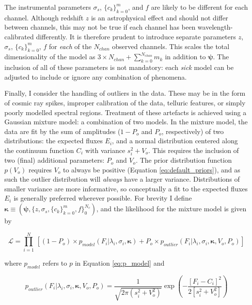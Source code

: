 \documentclass{aastex}
\newcommand{\sick}{\textit{sick}}
\begin{document}
The instrumental parameters $\sigma_{s}$, $\{c_k\}_{k=0}^{m}$, and $f$ are likely 
to be different for each channel. Although redshift $z$ is an astrophysical effect 
and should not differ between channels, this may not be true if each channel has 
been wavelength-calibrated differently. It is therefore prudent to introduce 
separate parameters $z$, $\sigma_{s}$, $\{c_k\}_{k=0}^{m}$, $f$ for \textit{each} 
of the $N_{chan}$ observed channels. This scales the total dimensionality of the 
model as $3\times{}N_{chan} + \sum_{k=0}^{N_{chan}}m_{k}$ in addition to $\bm{\psi}$. 
The inclusion of all of these parameters is not mandatory: each \sick{} model can 
be adjusted to include or ignore any combination of phenomena. 

Finally, I consider the handling of outliers in the data. These may be in the form 
of cosmic ray spikes, improper calibration of the data, telluric features, or simply 
poorly modelled spectral regions. Treatment of these artefacts is achieved using a 
Gaussian mixture model: a combination of two models. In the mixture model, the data 
are fit by the sum of amplitudes ($1 - P_o$ and $P_o$, respectively) of two 
distributions: the expected fluxes $E_i$, and a normal distribution centered along 
the continuum function $C_i$ with variance $s_{i}^2 + V_{o}$. This requires the 
inclusion of two (final) additional parameters: $P_o$ and $V_o$. The prior 
distribution function $p\left(V_o\right)$ requires $V_{o}$ to always be positive 
(Equation \ref{eq:default_priors}), and as such the outlier distribution will 
\textit{always} have a larger variance. Distributions of smaller variance are more 
informative, so conceptually a fit to the expected fluxes $E_{i}$ is generally 
preferred wherever possible. For brevity I define $\bm{\kappa} \equiv (\bm{\psi},\{z,\sigma_s,\{c_k\}_{k=0}^{m},f\}_{0}^{N_{c}})$, and the likelihood for the mixture model is given by
 
 \begin{equation}
\mathcal{L} = \prod_{i=1}^{N}\,\left[\left(1 - P_{o}\right)\times{}p_{model}\left(F_i|\lambda_i,\sigma_{i},\bm{\kappa}\right) + P_{o}\times{}p_{outlier}\left(F_i|\lambda_i,\sigma_i,\bm{\kappa},V_{o},P_o\right)\right]
\end{equation}
 
\noindent{}where $p_{model}$ refers to $p$ in Equation \ref{eq:p_model} and 

\begin{equation}
p_{outlier}\left(F_i|\lambda_i,\sigma_i,\bm{\kappa},V_{o},P_o\right) = \frac{1}{\sqrt{2\pi\left(s_{i}^2 + V_{o}^2\right)}} \exp\left(-\frac{[F_i - C_i]^2}{2\left[s_{i}^2 + V_{o}^2\right]}\right)
\end{equation}
\end{document}
